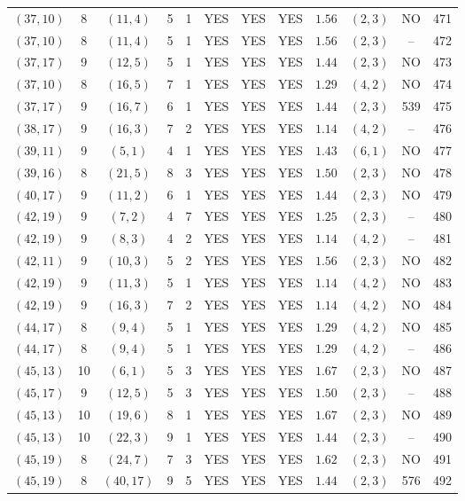 \begin{longtable}{|c|c|c|c|c|c|c|c|c|c|c|c|}
$(37,10)$ & 8 & $(11,4)$ & 5 & 1 & YES & YES & YES & $1.56$ & $(2,3)$ & NO & 471\\
$(37,10)$ & 8 & $(11,4)$ & 5 & 1 & YES & YES & YES & $1.56$ & $(2,3)$ & -- & 472\\
$(37,17)$ & 9 & $(12,5)$ & 5 & 1 & YES & YES & YES & $1.44$ & $(2,3)$ & NO & 473\\
$(37,10)$ & 8 & $(16,5)$ & 7 & 1 & YES & YES & YES & $1.29$ & $(4,2)$ & NO & 474\\
$(37,17)$ & 9 & $(16,7)$ & 6 & 1 & YES & YES & YES & $1.44$ & $(2,3)$ & 539 & 475\\
$(38,17)$ & 9 & $(16,3)$ & 7 & 2 & YES & YES & YES & $1.14$ & $(4,2)$ & -- & 476\\
$(39,11)$ & 9 & $(5,1)$ & 4 & 1 & YES & YES & YES & $1.43$ & $(6,1)$ & NO & 477\\
$(39,16)$ & 8 & $(21,5)$ & 8 & 3 & YES & YES & YES & $1.50$ & $(2,3)$ & NO & 478\\
$(40,17)$ & 9 & $(11,2)$ & 6 & 1 & YES & YES & YES & $1.44$ & $(2,3)$ & NO & 479\\
$(42,19)$ & 9 & $(7,2)$ & 4 & 7 & YES & YES & YES & $1.25$ & $(2,3)$ & -- & 480\\
$(42,19)$ & 9 & $(8,3)$ & 4 & 2 & YES & YES & YES & $1.14$ & $(4,2)$ & -- & 481\\
$(42,11)$ & 9 & $(10,3)$ & 5 & 2 & YES & YES & YES & $1.56$ & $(2,3)$ & NO & 482\\
$(42,19)$ & 9 & $(11,3)$ & 5 & 1 & YES & YES & YES & $1.14$ & $(4,2)$ & NO & 483\\
$(42,19)$ & 9 & $(16,3)$ & 7 & 2 & YES & YES & YES & $1.14$ & $(4,2)$ & NO & 484\\
$(44,17)$ & 8 & $(9,4)$ & 5 & 1 & YES & YES & YES & $1.29$ & $(4,2)$ & NO & 485\\
$(44,17)$ & 8 & $(9,4)$ & 5 & 1 & YES & YES & YES & $1.29$ & $(4,2)$ & -- & 486\\
$(45,13)$ & 10 & $(6,1)$ & 5 & 3 & YES & YES & YES & $1.67$ & $(2,3)$ & NO & 487\\
$(45,17)$ & 9 & $(12,5)$ & 5 & 3 & YES & YES & YES & $1.50$ & $(2,3)$ & -- & 488\\
$(45,13)$ & 10 & $(19,6)$ & 8 & 1 & YES & YES & YES & $1.67$ & $(2,3)$ & NO & 489\\
$(45,13)$ & 10 & $(22,3)$ & 9 & 1 & YES & YES & YES & $1.44$ & $(2,3)$ & -- & 490\\
$(45,19)$ & 8 & $(24,7)$ & 7 & 3 & YES & YES & YES & $1.62$ & $(2,3)$ & NO & 491\\
$(45,19)$ & 8 & $(40,17)$ & 9 & 5 & YES & YES & YES & $1.44$ & $(2,3)$ & 576 & 492\\

\end{longtable}
